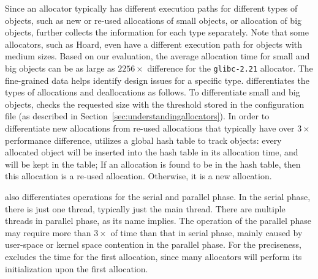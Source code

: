 Since an allocator typically has different execution paths for different types of objects, such as new or re-used allocations of small objects, or allocation of big objects, \MP{} further collects the information for each type separately. Note that some allocators, such as Hoard, even have a different execution path for  objects with medium sizes. Based on our evaluation, the average allocation time for small and big objects can be as large as $2256\times$ difference for the \texttt{glibc-2.21} allocator. The fine-grained data helps identify design issues for a specific type. \MP{} differentiates the types of allocations and deallocations as follows. To differentiate small and big objects, \MP{} checks the requested size with the threshold stored in the configuration file (as described in Section~\ref{sec:understandingallocators}). In order to differentiate new allocations from re-used allocations that typically have over $3\times$ performance difference, \MP{} utilizes a global hash table to track objects: every allocated object will be inserted into the hash table in its allocation time, and will be kept in the table; If an allocation is found to be in the hash table, then this allocation is a re-used allocation. Otherwise, it is a new allocation. 

\MP{} also differentiates operations for the serial and parallel phase. In the serial phase, there is just one thread, typically just the main thread. There are multiple threads in parallel phase, as its name implies. The operation of the parallel phase may require more than $3\times$ of time than that in serial phase, mainly caused by user-space or kernel space contention in the parallel phase. For the preciseness, \MP{} excludes the time for the first allocation, since many allocators will perform its initialization upon the first allocation.  


